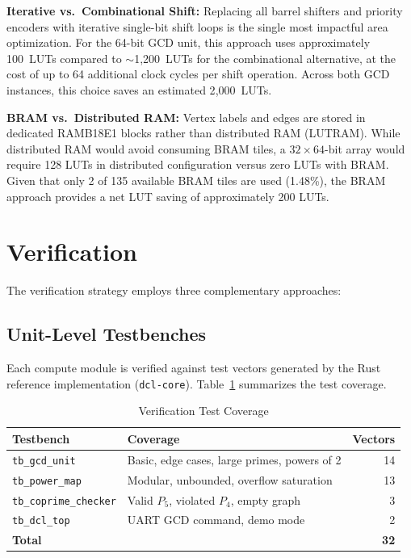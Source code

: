 \documentclass[lettersize,journal]{IEEEtran}
\begin{document}
\textbf{Iterative vs.\ Combinational Shift:} Replacing all barrel shifters and priority encoders with iterative single-bit shift loops is the single most impactful area optimization. For the 64-bit GCD unit, this approach uses approximately 100~LUTs compared to $\sim$1{,}200~LUTs for the combinational alternative, at the cost of up to 64 additional clock cycles per shift operation. Across both GCD instances, this choice saves an estimated 2{,}000~LUTs.

\textbf{BRAM vs.\ Distributed RAM:} Vertex labels and edges are stored in dedicated RAMB18E1 blocks rather than distributed RAM (LUTRAM). While distributed RAM would avoid consuming BRAM tiles, a $32 \times 64$-bit array would require 128 LUTs in distributed configuration versus zero LUTs with BRAM. Given that only 2 of 135 available BRAM tiles are used (1.48\%), the BRAM approach provides a net LUT saving of approximately 200 LUTs.

\section{Verification}
\label{sec:verify}

The verification strategy employs three complementary approaches:

\subsection{Unit-Level Testbenches}

Each compute module is verified against test vectors generated by the Rust reference implementation (\texttt{dcl-core}). Table~\ref{tab:testcov} summarizes the test coverage.

\begin{table}[!t]
\caption{Verification Test Coverage\label{tab:testcov}}
\centering
\begin{tabular}{@{}llr@{}}
\toprule
\textbf{Testbench} & \textbf{Coverage} & \textbf{Vectors} \\
\midrule
\texttt{tb\_gcd\_unit}        & Basic, edge cases, large primes, powers of 2 & 14 \\
\texttt{tb\_power\_map}       & Modular, unbounded, overflow saturation       & 13 \\
\texttt{tb\_coprime\_checker} & Valid $P_5$, violated $P_4$, empty graph       & 3 \\
\texttt{tb\_dcl\_top}         & UART GCD command, demo mode                   & 2 \\
\midrule
\textbf{Total}                &                                                & \textbf{32} \\
\bottomrule
\end{tabular}
\end{table}
\end{document}
